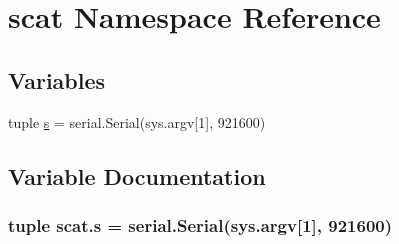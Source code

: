 \hypertarget{namespacescat}{}\section{scat Namespace Reference}
\label{namespacescat}
\subsection*{Variables}
\begin{DoxyCompactItemize}
\item 
tuple \hyperlink{namespacescat_ab96172d2744a33aed0e04b932f83593e}{s} = serial.\+Serial(sys.\+argv\mbox{[}1\mbox{]}, 921600)
\end{DoxyCompactItemize}


\subsection{Variable Documentation}
\hypertarget{namespacescat_ab96172d2744a33aed0e04b932f83593e}{}
\subsubsection[{s}]{\setlength{\rightskip}{0pt plus 5cm}tuple scat.\+s = serial.\+Serial(sys.\+argv\mbox{[}1\mbox{]}, 921600)}\label{namespacescat_ab96172d2744a33aed0e04b932f83593e}
